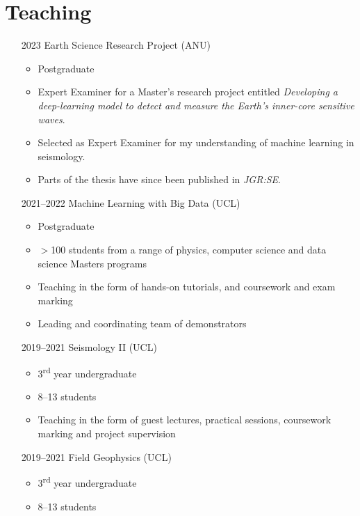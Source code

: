 
\section{Teaching}
\begin{itemize}
    \item[2023] Earth Science Research Project (ANU)
        \begin{itemize}
            \item Postgraduate
            \item Expert Examiner for a Master's research project entitled \textit{Developing a deep-learning model to detect and measure the Earth's inner-core sensitive waves}.
            \item Selected as Expert Examiner for my understanding of machine learning in seismology.
            \item Parts of the thesis have since been published in \textit{JGR:SE}.
        \end{itemize}
    \item[2021--2022] Machine Learning with Big Data (UCL)
        \begin{itemize}
            \item Postgraduate
            \item \(>\)100 students from a range of physics, computer science and data science Masters programs
            \item Teaching in the form of hands-on tutorials, and coursework and exam marking
            \item Leading and coordinating team of demonstrators
        \end{itemize}
    \item[2019--2021] Seismology II (UCL)
        \begin{itemize}
            \item 3\textsuperscript{rd} year undergraduate
            \item 8--13 students
            \item Teaching in the form of guest lectures, practical sessions, coursework marking and project supervision
        \end{itemize}
    \item[2019--2021] Field Geophysics (UCL)
        \begin{itemize}
            \item 3\textsuperscript{rd} year undergraduate
            \item 8--13 students

\end{itemize}
\end{itemize}
